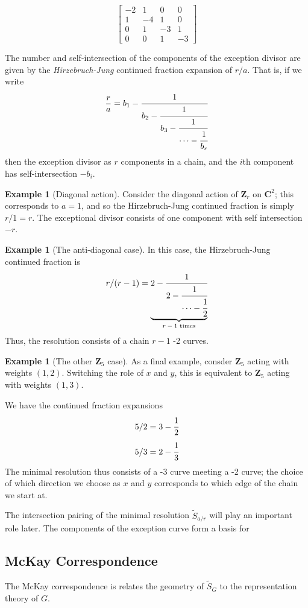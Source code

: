 \documentclass{amsart}[12pt]
\theoremstyle{definition}
\newtheorem{example}[dummy]{Example}
\newcommand{\Z}{\mathbf{Z}}
\newcommand{\C}{\mathbf{C}}
\begin{document}
$$
\begin{bmatrix}
-2 & 1 & 0 & 0 \\
1 & -4 & 1 & 0 \\
0 & 1 & -3 & 1 \\
0 & 0 & 1 & -3 
\end{bmatrix}
$$

The number and self-intersection of the components of the exception divisor are given by the \emph{Hirzebruch-Jung} continued fraction expansion of $r/a$.  That is, if we write
$$
\frac{r}{a}=b_1-\cfrac{1}{b_2-\cfrac{1}{b_3-\cfrac{1}{\cdots - \cfrac{1}{b_r}}}}
$$  
then the exception divisor as $r$ components in a chain, and the $i$th component has self-intersection $-b_i$. 

\begin{example}[Diagonal action]
Consider the diagonal action of $\Z_r$ on $\C^2$; this corresponds to $a=1$, and so the Hirzebruch-Jung continued fraction is simply $r/1=r$.  The exceptional divisor consists of one component with self intersection $-r$.

\end{example}


\begin{example}[The anti-diagonal case]  
In this case, the Hirzebruch-Jung continued fraction is
$$r/(r-1)=\underbrace{2-\cfrac{1}{2-\cfrac{1}{\cdots-\cfrac{1}{2}}}}_{\text{$r-1$ times}}$$
Thus, the resolution consists of a chain $r-1$ -2 curves.
\end{example}

\begin{example}[The other $\Z_5$ case]
As a final example, consder $\Z_5$ acting with weights $(1,2)$.  Switching the role of $x$ and $y$, this is equivalent to $\Z_5$ acting with weights $(1,3)$.

We have the continued fraction expansions
$$5/2=3-\cfrac{1}{2}$$
$$5/3=2-\cfrac{1}{3}$$
The minimal resolution thus consists of a -3 curve meeting a -2 curve; the choice of which direction we choose as $x$ and $y$ corresponds to which edge of the chain we start at.
\end{example}

The intersection pairing of the minimal resolution $\widetilde{S}_{a/r}$ will play an important role later.  The components of the exception curve form a basis for 


\subsection{McKay Correspondence}
The McKay correspondence is relates the geometry of $\widetilde{S}_G$ to the representation theory of $G$.
\end{document}

